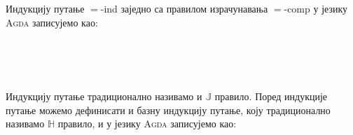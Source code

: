 Индукцију путање $=$-ind заједно са правилом израчунавања $=$-comp у језику \textsc{Agda} записујемо као:
\begin{code}%
\>[0]%
\>[1047I]\AgdaSymbol{:}\AgdaSpace{}%
\AgdaSymbol{(}\AgdaSpace{}%
\AgdaSymbol{:}\AgdaSpace{}%
\AgdaSpace{}%
\AgdaSpace{}%
\AgdaSymbol{)}\AgdaSpace{}%
\AgdaSymbol{(}\AgdaSpace{}%
\AgdaSymbol{:}\AgdaSpace{}%
\AgdaSymbol{(}\AgdaSpace{}%
\AgdaSpace{}%
\AgdaSymbol{:}\AgdaSpace{}%
\AgdaSymbol{)}\AgdaSpace{}%
\AgdaSpace{}%
\AgdaSpace{}%
\AgdaOperator{\AgdaFunction{==}}\AgdaSpace{}%
\AgdaSpace{}%
\AgdaSpace{}%
\AgdaSpace{}%
\AgdaSpace{}%
\AgdaSymbol{)}\<%
\\
\>[.][@{}l@{}]\<[1047I]%
\>[2]\AgdaSpace{}%
\AgdaSymbol{((}\AgdaSpace{}%
\AgdaSymbol{:}\AgdaSpace{}%
\AgdaSymbol{)}\AgdaSpace{}%
\AgdaSpace{}%
\AgdaSpace{}%
\AgdaSpace{}%
\AgdaSpace{}%
\AgdaSymbol{(}\AgdaSpace{}%
\AgdaSymbol{))}\<%
\\
%
\>[2]\AgdaSpace{}%
\AgdaSymbol{((}\AgdaSpace{}%
\AgdaSpace{}%
\AgdaSymbol{:}\AgdaSpace{}%
\AgdaSymbol{)}\AgdaSpace{}%
\AgdaSymbol{(}\AgdaSpace{}%
\AgdaSymbol{:}\AgdaSpace{}%
\AgdaSpace{}%
\AgdaOperator{\AgdaFunction{==}}\AgdaSpace{}%
\AgdaSymbol{)}\AgdaSpace{}%
\AgdaSpace{}%
\AgdaSpace{}%
\AgdaSpace{}%
\AgdaSpace{}%
\AgdaSymbol{)}\<%
\\
\>[0]\AgdaSpace{}%
\AgdaSpace{}%
\AgdaSpace{}%
\AgdaSpace{}%
\AgdaSpace{}%
\AgdaSpace{}%
\AgdaSymbol{(}\AgdaSpace{}%
\AgdaSymbol{)}\AgdaSpace{}%
\AgdaSymbol{=}\AgdaSpace{}%
\AgdaSpace{}%
\<%
\end{code}
Индукцију путање традиционално називамо и $\mathbb{J}$ правило. Поред индукције путање можемо дефинисати и базну индукцију путање, коју традиционално називамо $\mathbb{H}$ правило, и у језику \textsc{Agda} записујемо као:
